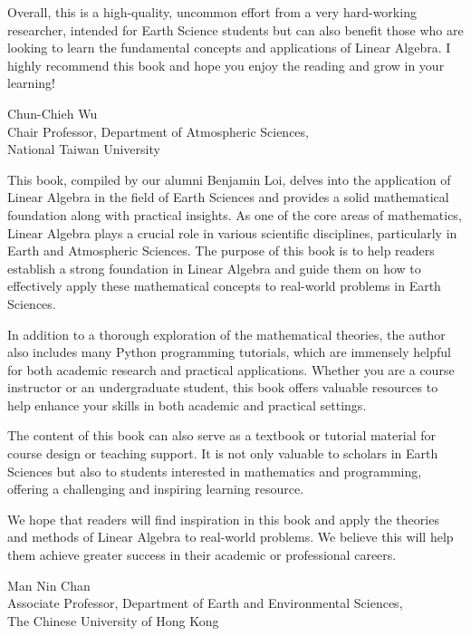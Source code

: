 Overall, this is a high-quality, uncommon effort from a very hard-working researcher, intended for Earth Science students but can also benefit those who are looking to learn the fundamental concepts and applications of Linear Algebra. I highly recommend this book and hope you enjoy the reading and grow in your learning!

{\raggedleft Chun-Chieh Wu\\
Chair Professor, Department of Atmospheric Sciences,\\
National Taiwan University \par}

\newpage

This book, compiled by our alumni Benjamin Loi, delves into the application of Linear Algebra in the field of Earth Sciences and provides a solid mathematical foundation along with practical insights. As one of the core areas of mathematics, Linear Algebra plays a crucial role in various scientific disciplines, particularly in Earth and Atmospheric Sciences. The purpose of this book is to help readers establish a strong foundation in Linear Algebra and guide them on how to effectively apply these mathematical concepts to real-world problems in Earth Sciences.

In addition to a thorough exploration of the mathematical theories, the author also includes many Python programming tutorials, which are immensely helpful for both academic research and practical applications. Whether you are a course instructor or an undergraduate student, this book offers valuable resources to help enhance your skills in both academic and practical settings.

The content of this book can also serve as a textbook or tutorial material for course design or teaching support. It is not only valuable to scholars in Earth Sciences but also to students interested in mathematics and programming, offering a challenging and inspiring learning resource.

We hope that readers will find inspiration in this book and apply the theories and methods of Linear Algebra to real-world problems. We believe this will help them achieve greater success in their academic or professional careers.

{\raggedleft Man Nin Chan\\
Associate Professor, Department of Earth and Environmental Sciences,\\
The Chinese University of Hong Kong \par}

